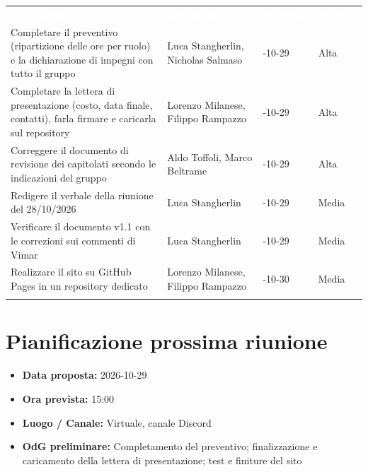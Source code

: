 \documentclass[12pt,a4paper]{article}
\newcommand{\tightlist}{\setlength{\itemsep}{1pt}\setlength{\parskip}{0pt}}
\begin{document}
\begin{center}
\begin{tabularx}{\linewidth}{>{\hsize=2.0\hsize\raggedright\arraybackslash}X >{\hsize=1.0\hsize\raggedright\arraybackslash}X >{\hsize=0.5\hsize\centering\arraybackslash}X >{\hsize=0.5\hsize\centering\arraybackslash}X}
\rowcolor{bfblue}\textcolor{white}{\textbf{Descrizione}} & \textcolor{white}{\textbf{Responsabile}} & \textcolor{white}{\textbf{Scadenza}} & \textcolor{white}{\textbf{Priorità}} \\
Completare il preventivo (ripartizione delle ore per ruolo) e la dichiarazione di impegni con tutto il gruppo & Luca Stangherlin, Nicholas Salmaso & 2026-10-29 & Alta \\ \arrayrulecolor{bfline}\hline
Completare la lettera di presentazione (costo, data finale, contatti), farla firmare e caricarla sul repository & Lorenzo Milanese, Filippo Rampazzo & 2026-10-29 & Alta \\ \arrayrulecolor{bfline}\hline
Correggere il documento di revisione dei capitolati secondo le indicazioni del gruppo & Aldo Toffoli, Marco Beltrame & 2026-10-29 & Alta \\ \arrayrulecolor{bfline}\hline
Redigere il verbale della riunione del 28/10/2026 & Luca Stangherlin & 2026-10-29 & Media \\ \arrayrulecolor{bfline}\hline
Verificare il documento v1.1 con le correzioni sui commenti di Vimar & Luca Stangherlin & 2026-10-29 & Media \\ \arrayrulecolor{bfline}\hline
Realizzare il sito su GitHub Pages in un repository dedicato & Lorenzo Milanese, Filippo Rampazzo & 2026-10-30 & Media\\ \arrayrulecolor{bfline}\hline
\end{tabularx}
\end{center}

\hypertarget{prossima-riunione}{%
\section{Pianificazione prossima riunione}}

\begin{itemize}
\tightlist
\item \textbf{Data proposta:} 2026-10-29
\item \textbf{Ora prevista:} 15:00
\item \textbf{Luogo / Canale:} Virtuale, canale Discord 
\item \textbf{OdG preliminare:} Completamento del preventivo; finalizzazione e caricamento della lettera di presentazione; test e finiture del sito
\end{itemize}
\end{document}
